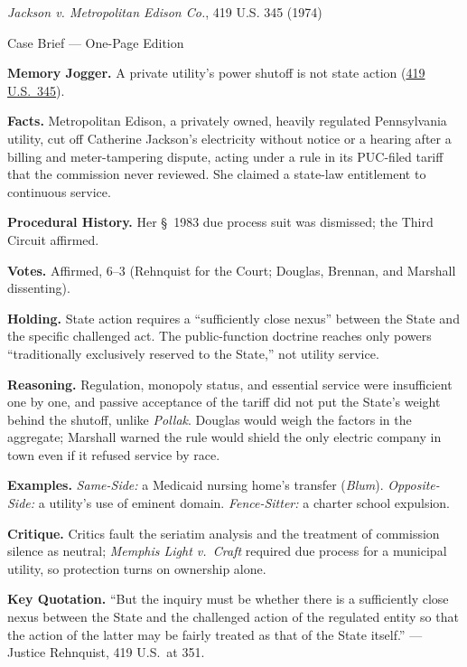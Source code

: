 \documentclass[12pt]{article}
\begin{document}
\begin{center}
{\Large \textit{Jackson v. Metropolitan Edison Co.}, 419 U.S. 345 (1974)\par}
\vspace{0.3em}
{\normalsize Case Brief --- One-Page Edition\par}
\end{center}

\textbf{Memory Jogger.} A private utility's power shutoff is not state action (\href{https://supreme.justia.com/cases/federal/us/419/345/}{419 U.S.\ 345}).

\textbf{Facts.} Metropolitan Edison, a privately owned, heavily regulated Pennsylvania utility, cut off Catherine Jackson's electricity without notice or a hearing after a billing and meter-tampering dispute, acting under a rule in its PUC-filed tariff that the commission never reviewed. She claimed a state-law entitlement to continuous service.

\textbf{Procedural History.} Her \S\ 1983 due process suit was dismissed; the Third Circuit affirmed.

\textbf{Votes.} Affirmed, 6--3 (Rehnquist for the Court; Douglas, Brennan, and Marshall dissenting).

\textbf{Holding.} State action requires a ``sufficiently close nexus'' between the State and the specific challenged act. The public-function doctrine reaches only powers ``traditionally exclusively reserved to the State,'' not utility service.

\textbf{Reasoning.} Regulation, monopoly status, and essential service were insufficient one by one, and passive acceptance of the tariff did not put the State's weight behind the shutoff, unlike \textit{Pollak}. Douglas would weigh the factors in the aggregate; Marshall warned the rule would shield the only electric company in town even if it refused service by race.

\textbf{Examples.} \emph{Same-Side:} a Medicaid nursing home's transfer (\textit{Blum}). \emph{Opposite-Side:} a utility's use of eminent domain. \emph{Fence-Sitter:} a charter school expulsion.

\textbf{Critique.} Critics fault the seriatim analysis and the treatment of commission silence as neutral; \textit{Memphis Light v.\ Craft} required due process for a municipal utility, so protection turns on ownership alone.

\textbf{Key Quotation.} ``But the inquiry must be whether there is a sufficiently close nexus between the State and the challenged action of the regulated entity so that the action of the latter may be fairly treated as that of the State itself.'' --- Justice Rehnquist, 419 U.S.\ at 351.
\end{document}
